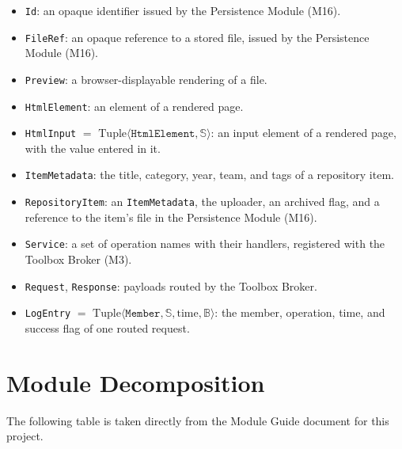 \documentclass[12pt, titlepage]{article}
\begin{document}
\begin{itemize}
  \item \texttt{Id}: an opaque identifier issued by the Persistence Module (M16).
  \item  \texttt{FileRef}: an opaque reference to a stored file, issued by the Persistence Module (M16).
  \item \texttt{Preview}: a browser-displayable rendering of a file.
  \item \texttt{HtmlElement}: an element of a rendered page.
  \item \texttt{HtmlInput} $=$ $\text{Tuple}\langle \texttt{HtmlElement}, \mathbb{S} \rangle$: an input element of a rendered page, with the value entered in it.
  \item \texttt{ItemMetadata}: the title, category, year, team, and tags of a repository item. 
  \item \texttt{RepositoryItem}: an \texttt{ItemMetadata}, the uploader, an archived flag, and a reference to the item's file in the Persistence Module (M16).
  \item \texttt{Service}: a set of operation names with their handlers, registered with the Toolbox Broker (M3). 
  \item \texttt{Request}, \texttt{Response}: payloads routed by the Toolbox Broker.
  \item \texttt{LogEntry} $=$ $\text{Tuple}\langle \texttt{Member}, \mathbb{S}, \text{time}, \mathbb{B} \rangle$: the member, operation, time, and success flag of one routed request.
\end{itemize}


\section{Module Decomposition}

The following table is taken directly from the Module Guide document for this project.
\end{document}
